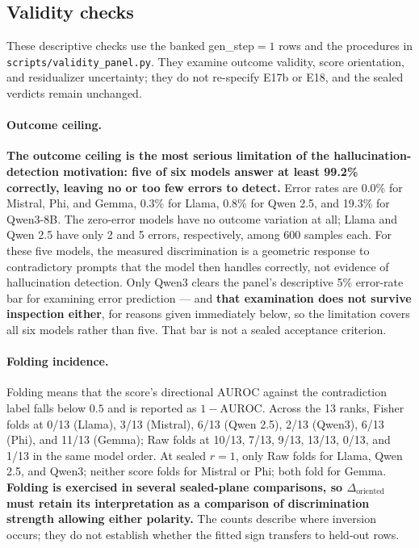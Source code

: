 \documentclass[10pt, letterpaper]{article}
\newcommand{\auroc}{\text{AUROC}}
\newcommand{\Doriented}{\Delta_{\text{oriented}}}
\begin{document}
\subsection{Validity checks}
\label{sec:results:validity}

These descriptive checks use the banked gen\_step$=1$ rows and the
procedures in \texttt{scripts/validity\_panel.py}. They examine outcome
validity, score orientation, and residualizer uncertainty; they do not
re-specify E17b or E18, and the sealed verdicts remain unchanged.

\paragraph{Outcome ceiling.}
\textbf{The outcome ceiling is the most serious limitation of the
hallucination-detection motivation: five of six models answer at least
99.2\% correctly, leaving no or too few errors to detect.}
Error rates are 0.0\% for Mistral, Phi, and Gemma, 0.3\% for Llama,
0.8\% for Qwen 2.5, and 19.3\% for Qwen3-8B. The zero-error models
have no outcome variation at all; Llama and Qwen 2.5 have only 2 and
5 errors, respectively, among 600 samples each. For these five models,
the measured discrimination is a geometric response to contradictory
prompts that the model then handles correctly, not evidence of
hallucination detection. Only Qwen3 clears the panel's descriptive
5\% error-rate bar for examining error prediction --- and \textbf{that
examination does not survive inspection either}, for reasons given
immediately below, so the limitation covers all six models rather than
five. That bar is not a sealed acceptance criterion.

\paragraph{Folding incidence.}
Folding means that the score's directional $\auroc$ against the
contradiction label falls below $0.5$ and is reported as
$1-\auroc$. Across the 13 ranks, Fisher folds at 0/13 (Llama),
3/13 (Mistral), 6/13 (Qwen 2.5), 2/13 (Qwen3), 6/13 (Phi), and
11/13 (Gemma); Raw folds at 10/13, 7/13, 9/13, 13/13, 0/13, and
1/13 in the same model order. At sealed $r=1$, only Raw folds for
Llama, Qwen 2.5, and Qwen3; neither score folds for Mistral or Phi;
both fold for Gemma. \textbf{Folding is exercised in several sealed-plane
comparisons, so $\Doriented$ must retain its interpretation as a
comparison of discrimination strength allowing either polarity.}
The counts describe where inversion occurs; they do not establish
whether the fitted sign transfers to held-out rows.
\end{document}
